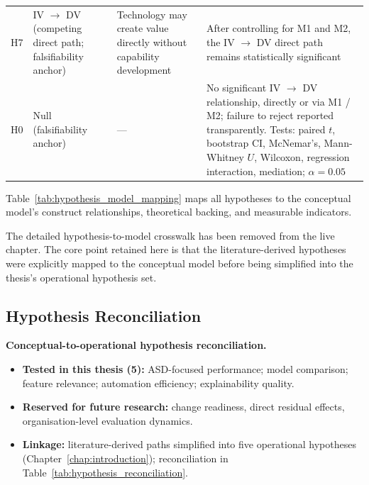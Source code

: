 {\begin{xltabular}{\textwidth}{@{} >{\raggedright\arraybackslash}p{0.6cm} >{\raggedright\arraybackslash}p{2.0cm} L L @{}}
\addlinespace
H7 & IV $\to$ DV (competing direct path; falsifiability anchor) & Technology may create value directly without capability development & After controlling for M1 and M2, the IV $\to$ DV direct path remains statistically significant \\
\addlinespace
\midrule
H0 & Null (falsifiability anchor) & --- & No significant IV $\to$ DV relationship, directly or via M1 / M2; failure to reject reported transparently. Tests: paired $t$, bootstrap CI, McNemar's, Mann-Whitney $U$, Wilcoxon, regression interaction, mediation; $\alpha = 0.05$ \\
\end{xltabular}}

Table~\ref{tab:hypothesis_model_mapping} maps all hypotheses to the conceptual model's construct relationships, theoretical backing, and measurable indicators.

\noindent The detailed hypothesis-to-model crosswalk has been removed from the live chapter. The core point retained here is that the literature-derived hypotheses were explicitly mapped to the conceptual model before being simplified into the thesis's operational hypothesis set.

\subsection{Hypothesis Reconciliation}

\noindent\textbf{Conceptual-to-operational hypothesis reconciliation.}
\begin{itemize}[leftmargin=*, itemsep=2pt]
    \item \textbf{Tested in this thesis (5):} ASD-focused performance; model comparison; feature relevance; automation efficiency; explainability quality.
    \item \textbf{Reserved for future research:} change readiness, direct residual effects, organisation-level evaluation dynamics.
    \item \textbf{Linkage:} literature-derived paths simplified into five operational hypotheses (Chapter~\ref{chap:introduction}); reconciliation in Table~\ref{tab:hypothesis_reconciliation}.
\end{itemize}


